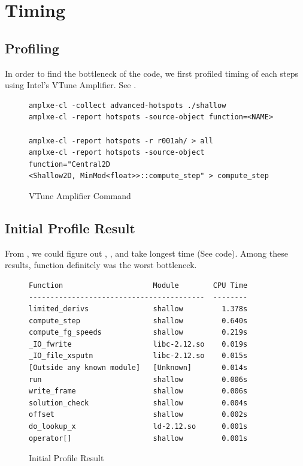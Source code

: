 \section{Timing}\label{sec:timing}
\subsection{Profiling}
In order to find the bottleneck of the code, we first profiled timing of each
steps using Intel’s VTune Amplifier. See .

\begin{figure}[h]
\footnotesize
\begin{verbatim}
amplxe-cl -collect advanced-hotspots ./shallow
amplxe-cl -report hotspots -source-object function=<NAME>

amplxe-cl -report hotspots -r r001ah/ > all
amplxe-cl -report hotspots -source-object function="Central2D
<Shallow2D, MinMod<float>>::compute_step" > compute_step
\end{verbatim}
\caption{VTune Amplifier Command}
\label{fig:amplxe-command}
\end{figure}

\subsection{Initial Profile Result}

From , we could figure out
, , and  take
longest time (See  code). Among these results,
 function definitely was the worst bottleneck.

\begin{figure}[h]
\footnotesize
\begin{verbatim}
Function                     Module        CPU Time
-----------------------------------------  --------
limited_derivs               shallow         1.378s
compute_step                 shallow         0.640s
compute_fg_speeds            shallow         0.219s
_IO_fwrite                   libc-2.12.so    0.019s
_IO_file_xsputn              libc-2.12.so    0.015s
[Outside any known module]   [Unknown]       0.014s
run                          shallow         0.006s
write_frame                  shallow         0.006s
solution_check               shallow         0.004s
offset                       shallow         0.002s
do_lookup_x                  ld-2.12.so      0.001s
operator[]                   shallow         0.001s
\end{verbatim}
\caption{Initial Profile Result}
\label{fig:initial-profile-result}
\end{figure}

